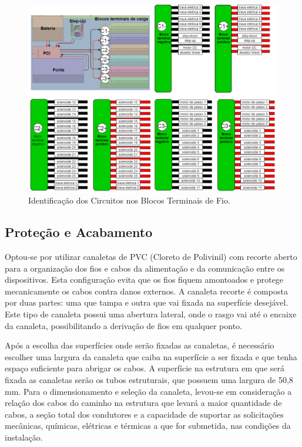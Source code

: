\begin{figure}[!htb]
    \centering
     \includegraphics[width=1\textwidth, height=2\textheight,keepaspectratio]{figuras/energia/diagramas/etiquetagem.png}
    \caption{Identificação dos Circuitos nos Blocos Terminais de Fio.}
    \label{fig:diagrama_etiqueta}
\end{figure}

\subsection{Proteção e Acabamento}
\label{energia_subseção_cabos}

Optou-se por utilizar canaletas de PVC (Cloreto de Polivinil) com recorte aberto para a organização dos fios e cabos da alimentação e da comunicação entre os dispositivos. Esta configuração evita que os fios fiquem amontoados e protege mecanicamente os cabos contra danos externos. A canaleta recorte é composta por duas partes: uma que tampa e outra que vai fixada na superfície desejável. Este tipo de canaleta possui uma abertura lateral, onde o rasgo vai até o encaixe da canaleta, possibilitando a derivação de fios em qualquer ponto.

Após a escolha das superfícies onde serão fixadas as canaletas, é necessário escolher uma largura da canaleta que caiba na superfície a ser fixada e que tenha espaço suficiente para abrigar os cabos. A superfície na estrutura em que será fixada as canaletas serão os tubos estruturais, que possuem uma largura de 50,8 mm. Para o dimensionamento e seleção da canaleta, levou-se em consideração a relação dos cabos do caminho na estrutura que levará a maior quantidade de cabos, a seção total dos condutores e a capacidade de suportar as solicitações mecânicas, químicas, elétricas e térmicas a que for submetida, nas condições da instalação. 


